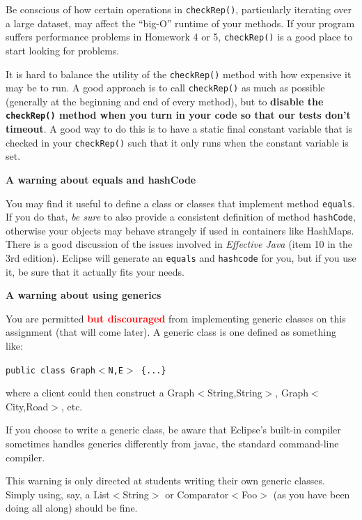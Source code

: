 \documentclass[11pt]{article}
\begin{document}
\noindent Be conscious of how certain operations in \texttt{checkRep()}, particularly iterating over a large dataset, may affect the “big-O” runtime of your methods. If your program suffers performance problems in Homework 4 or 5, \texttt{checkRep()} is a good place to start looking for problems.

\noindent It is hard to balance the utility of the \texttt{checkRep()} method with how expensive it may be to run. A good approach is to call \texttt{checkRep()} as much as possible (generally at the beginning and end of every method), but to \textbf{disable the \texttt{checkRep()} method when you turn in your code so that our tests don't timeout}. A good way to do this is to have a static final constant variable that is checked in your \texttt{checkRep()} such that it only runs when the constant variable is set.

\noindent \large{\textbf{A warning about equals and hashCode}}

\noindent You may find it useful to define a class or classes that implement method \texttt{equals}. If you do that, 
\textit{be sure} to also provide a consistent definition of method \texttt{hashCode}, otherwise your objects may behave strangely if used in containers like HashMaps. There is a good discussion of the issues involved in \textit{Effective Java} (item 10 in the 3rd edition). Eclipse will generate an \texttt{equals} and \texttt{hashcode} for you, but if you use it, be sure that it actually fits your needs.

\noindent \large{\textbf{A warning about using generics}}

You are permitted \textcolor{red}{\textbf{but discouraged}} from implementing generic classes on this assignment (that will come later). A generic class is one defined as something like:

\texttt{public class Graph$<$N,E$>$ \{...\}}


\noindent where a client could then construct a Graph$<$String,String$>$, Graph$<$City,Road$>$, etc.

\noindent If you choose to write a generic class, be aware that Eclipse's built-in compiler sometimes handles generics differently from javac, the standard command-line compiler.

\noindent This warning is only directed at students writing their own generic classes. Simply using, say, a List$<$String$>$ or Comparator$<$Foo$>$ (as you have been doing all along) should be fine.

\newpage
\end{document}
